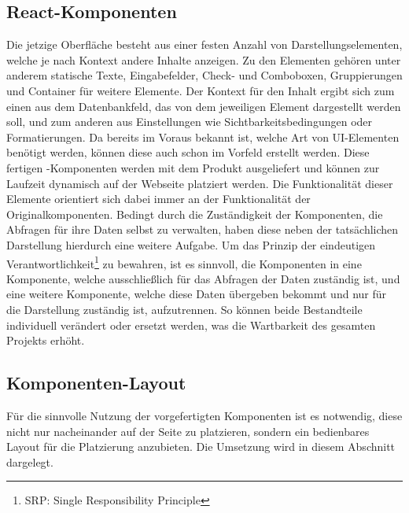 \subsection{React-Komponenten}
Die jetzige Oberfläche besteht aus einer festen Anzahl von Darstellungselementen, welche je nach Kontext andere Inhalte anzeigen. Zu den Elementen gehören unter anderem statische Texte, Eingabefelder, Check- und Comboboxen, Gruppierungen und Container für weitere Elemente. Der Kontext für den Inhalt ergibt sich zum einen aus dem Datenbankfeld, das von dem jeweiligen Element dargestellt werden soll, und zum anderen aus Einstellungen wie Sichtbarkeitsbedingungen oder Formatierungen. Da bereits im Voraus bekannt ist, welche Art von UI-Elementen benötigt werden, können diese auch schon im Vorfeld erstellt werden. Diese fertigen -Komponenten werden mit dem Produkt ausgeliefert und können zur Laufzeit dynamisch auf der Webseite platziert werden. Die Funktionalität dieser Elemente orientiert sich dabei immer an der Funktionalität der Originalkomponenten.
Bedingt durch die Zuständigkeit der Komponenten, die\\ Abfragen für ihre Daten selbst zu verwalten, haben diese neben der tatsächlichen Darstellung hierdurch eine weitere Aufgabe. Um das Prinzip der eindeutigen Verantwortlichkeit\footnote{SRP\@: Single Responsibility Principle} zu bewahren, ist es sinnvoll, die Komponenten in eine Komponente, welche ausschließlich für das Abfragen der Daten zuständig ist, und eine weitere Komponente, welche diese Daten übergeben bekommt und nur für die Darstellung zuständig ist, aufzutrennen. So können beide Bestandteile individuell verändert oder ersetzt werden, was die Wartbarkeit des gesamten Projekts erhöht.

\subsection{Komponenten-Layout}
Für die sinnvolle Nutzung der vorgefertigten Komponenten ist es notwendig, diese nicht nur nacheinander auf der Seite zu platzieren, sondern ein bedienbares Layout für die Platzierung anzubieten. Die Umsetzung wird in diesem Abschnitt dargelegt.

